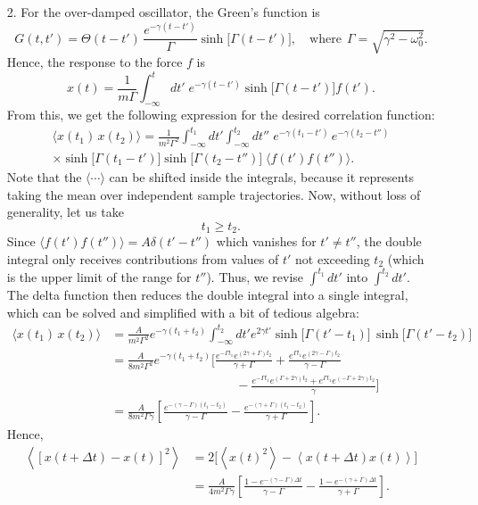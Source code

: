 \documentclass[10pt,a4paper]{article}
\begin{document}
\begin{enumerate}
\item [2.]
For the over-damped oscillator, the Green's function is
\begin{equation}
  G(t,t') = \Theta(t-t')\, \frac{e^{-\gamma(t-t')}}{\Gamma} \sinh\big[\Gamma(t-t')\big], \quad\mathrm{where}\;\,\Gamma = \sqrt{\gamma^2 - \omega_0^2}.
\end{equation}
Hence, the response to the force $f$ is
\begin{equation}
  x(t) = \frac{1}{m\Gamma} \int^t_{-\infty} dt'\; e^{-\gamma(t-t')} \sinh\big[\Gamma(t-t')\big] f(t').
\end{equation}
From this, we get the following expression for the desired correlation
function:
\begin{multline}
  \langle x(t_1)\, x(t_2)\rangle = \frac{1}{m^2\Gamma^2} \int^{t_1}_{-\infty} dt' \int^{t_2}_{-\infty} dt'' \; e^{-\gamma(t_1-t')}\, e^{-\gamma(t_2-t'')} \\
  \times \sinh\big[\Gamma(t_1-t')\big] \sinh\big[\Gamma(t_2-t'')\big] \;
  \langle f(t') f(t'')\rangle.
\end{multline}
Note that the $\langle\cdots\rangle$ can be shifted inside the
integrals, because it represents taking the mean over independent sample
trajectories. Now, without loss of generality, let us take
\begin{equation}
  t_1 \ge t_2.
\end{equation}
Since $\langle f(t') f(t'')\rangle = A \delta(t'-t'')$ which vanishes
for $t' \ne t''$, the double integral only receives contributions from
values of $t'$ not exceeding $t_2$ (which is the upper limit of the
range for $t''$). Thus, we revise $\int^{t_1} dt'$ into $\int^{t_2}
dt'$. The delta function then reduces the double integral into a
single integral, which can be solved and simplified with a bit of
tedious algebra:
\begin{align}
  \langle x(t_1)\, x(t_2)\rangle &= \frac{A}{m^2\Gamma^2} e^{-\gamma(t_1+t_2)} \int^{t_2}_{-\infty} dt' e^{2\gamma t'} \sinh\big[\Gamma(t'-t_1)\big] \, \sinh\big[\Gamma(t'-t_2)\big] \\
  &= \frac{A}{8m^2\Gamma^2} e^{-\gamma(t_1+t_2)}\Bigg[\frac{e^{-\Gamma t_1} e^{(2\gamma+\Gamma)t_2}}{\gamma+\Gamma} + \frac{e^{\Gamma t_1}e^{(2\gamma-\Gamma)t_2}}{\gamma-\Gamma} \nonumber \\
    &\qquad\qquad\qquad\qquad\qquad - \frac{e^{-\Gamma t_1} e^{(\Gamma+2\gamma)t_2} + e^{\Gamma t_1} e^{(-\Gamma+2\gamma)t_2}}{\gamma}\Bigg] \\
  &= \frac{A}{8m^2\Gamma\gamma} \left[\frac{e^{-(\gamma-\Gamma)(t_1-t_2)}}{\gamma-\Gamma} - \frac{e^{-(\gamma+\Gamma)(t_1-t_2)}}{\gamma+\Gamma} \right].
\end{align}
Hence,
\begin{align}
  \left\langle [x(t+\Delta t) - x(t)]^2\right\rangle &= 2\Big[\left\langle x(t)^2\right\rangle - \left\langle x(t+\Delta t) x(t)\right\rangle\Big] \\
  &= \frac{A}{4m^2\Gamma\gamma} \left[\frac{1-e^{-(\gamma-\Gamma)\Delta t}}{\gamma-\Gamma} - \frac{1-e^{-(\gamma+\Gamma)\Delta t}}{\gamma+\Gamma} \right].
\end{align}
\end{enumerate}
\end{document}
